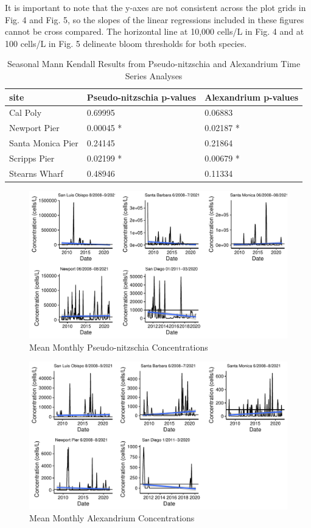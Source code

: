 \documentclass[
  12pt,
]{article}
\begin{document}
It is important to note that the y-axes are not consistent across the
plot grids in Fig. 4 and Fig. 5, so the slopes of the linear regressions
included in these figures cannot be cross compared. The horizontal line
at 10,000 cells/L in Fig. 4 and at 100 cells/L in Fig. 5 delineate bloom
thresholds for both species.

\begin{longtable}[t]{lll}
\caption{\label{tab:Table 4}Seasonal Mann Kendall Results from Pseudo-nitzschia and Alexandrium Time Series Analyses}\\
\toprule
site & Pseudo-nitzschia p-values & Alexandrium p-values\\
\midrule
Cal Poly & 0.69995 & 0.06883\\
Newport Pier & 0.00045 * & 0.02187 *\\
Santa Monica Pier & 0.24145 & 0.21864\\
Scripps Pier & 0.02199 * & 0.00679 *\\
Stearns Wharf & 0.48946 & 0.11334\\
\bottomrule
\end{longtable}

\begin{figure}
\centering
\includegraphics{Habs_Final_Report_files/figure-latex/combining Pseudo-nitzschia figures-1.pdf}
\caption{Mean Monthly Pseudo-nitzschia Concentrations}
\end{figure}

\begin{figure}
\centering
\includegraphics{Habs_Final_Report_files/figure-latex/combining Alexandrium figures-1.pdf}
\caption{Mean Monthly Alexandrium Concentrations}
\end{figure}
\end{document}
